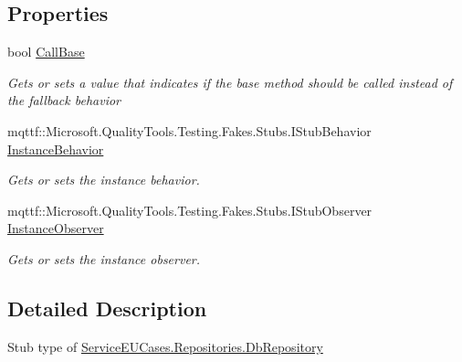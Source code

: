 \subsection*{Properties}
\begin{DoxyCompactItemize}
\item 
bool \hyperlink{class_service_e_u_cases_1_1_repositories_1_1_fakes_1_1_stub_db_repository_ae1d2b8efae90984f1a2f2a1b3978b390}{Call\-Base}
\begin{DoxyCompactList}\small\item\em Gets or sets a value that indicates if the base method should be called instead of the fallback behavior\end{DoxyCompactList}\item 
mqttf\-::\-Microsoft.\-Quality\-Tools.\-Testing.\-Fakes.\-Stubs.\-I\-Stub\-Behavior \hyperlink{class_service_e_u_cases_1_1_repositories_1_1_fakes_1_1_stub_db_repository_af34d9ff5badb05a2f73a47997ec5921e}{Instance\-Behavior}
\begin{DoxyCompactList}\small\item\em Gets or sets the instance behavior.\end{DoxyCompactList}\item 
mqttf\-::\-Microsoft.\-Quality\-Tools.\-Testing.\-Fakes.\-Stubs.\-I\-Stub\-Observer \hyperlink{class_service_e_u_cases_1_1_repositories_1_1_fakes_1_1_stub_db_repository_ac45d38dfea0e4e64ae3b1ac7a4a077ca}{Instance\-Observer}
\begin{DoxyCompactList}\small\item\em Gets or sets the instance observer.\end{DoxyCompactList}\end{DoxyCompactItemize}


\subsection{Detailed Description}
Stub type of \hyperlink{class_service_e_u_cases_1_1_repositories_1_1_db_repository}{Service\-E\-U\-Cases.\-Repositories.\-Db\-Repository}



